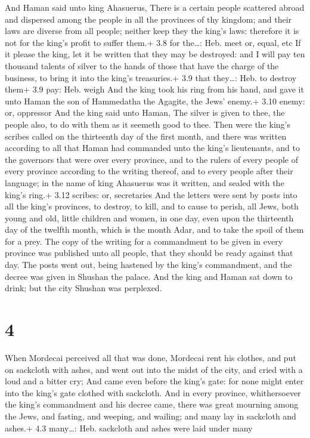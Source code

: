 And Haman said unto king Ahasuerus, There is a certain
people scattered abroad and dispersed among the people in all the
provinces of thy kingdom; and their laws are diverse from all people;
neither keep they the king's laws: therefore it is not for the king's
profit to suffer them.+ 3.8 for the\ldots: Heb. meet or, equal, etc
 If it please the king, let it be written that they may be
destroyed: and I will pay ten thousand talents of silver to the hands of
those that have the charge of the business, to bring it into the king's
treasuries.+ 3.9 that they\ldots: Heb. to destroy them+ 3.9 pay: Heb.
weigh  And the king took his ring from his hand, and gave
it unto Haman the son of Hammedatha the Agagite, the Jews' enemy.+ 3.10
enemy: or, oppressor  And the king said unto Haman, The
silver is given to thee, the people also, to do with them as it seemeth
good to thee.  Then were the king's scribes called on the
thirteenth day of the first month, and there was written according to
all that Haman had commanded unto the king's lieutenants, and to the
governors that were over every province, and to the rulers of every
people of every province according to the writing thereof, and to every
people after their language; in the name of king Ahasuerus was it
written, and sealed with the king's ring.+ 3.12 scribes: or, secretaries
 And the letters were sent by posts into all the king's
provinces, to destroy, to kill, and to cause to perish, all Jews, both
young and old, little children and women, in one day, even upon the
thirteenth day of the twelfth month, which is the month Adar, and to
take the spoil of them for a prey.  The copy of the writing
for a commandment to be given in every province was published unto all
people, that they should be ready against that day.  The
posts went out, being hastened by the king's commandment, and the decree
was given in Shushan the palace. And the king and Haman sat down to
drink; but the city Shushan was perplexed.

\hypertarget{section-3}{%
\section{4}\label{section-3}}

 When Mordecai perceived all that was done, Mordecai rent
his clothes, and put on sackcloth with ashes, and went out into the
midst of the city, and cried with a loud and a bitter cry; 
And came even before the king's gate: for none might enter into the
king's gate clothed with sackcloth.  And in every province,
whithersoever the king's commandment and his decree came, there was
great mourning among the Jews, and fasting, and weeping, and wailing;
and many lay in sackcloth and ashes.+ 4.3 many\ldots: Heb. sackcloth and
ashes were laid under many

